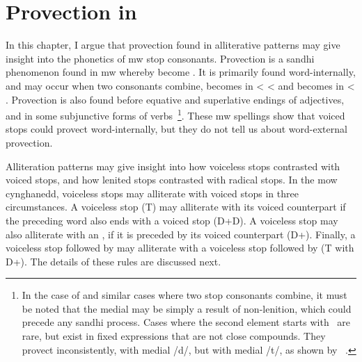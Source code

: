 \chapter{Provection in }
\label{cha:prov-mwbe-y}

In this chapter, I argue that provection found in alliterative patterns may give insight into the phonetics of \gls{mw} stop consonants.
Provection is a sandhi phenomenon found in \gls{mw} whereby  become .  It is primarily found word-internally, and
may occur when two consonants combine, \eg {} becomes 
in   <  <  and  becomes  in  < .
Provection is also found before equative and superlative endings of
adjectives, and in some subjunctive forms of
verbs~\autocite[§~17]{evans_grammar_1964}\footnote{In the case
  of  and similar cases where two stop consonants combine,
  it must be noted that the medial  may be simply a result of
  non-lenition, which could precede any sandhi process. Cases where
  the second element starts with \xD\ are rare, but exist in fixed
  expressions that are not close compounds. They provect
  inconsistently, \eg {} with
  medial /d/, but  with medial /t/, as
  shown by ~\autocite[s.v.\ \emph{rhad}]{bevan_geiriadur_2014}.}.
These \gls{mw} spellings show that voiced stops could provect
word-internally, but they do not tell us about word-external
provection.

Alliteration patterns may give insight into how voiceless stops
contrasted with voiced stops, and how lenited stops contrasted with
radical stops. In the \gls{mow} cynghanedd, voiceless stops may
alliterate with voiced stops in three circumstances. A voiceless stop
(\gls{T}) may alliterate with its voiced counterpart if the
preceding word also ends with a voiced stop (\gls{D}+\gls{D}). A
voiceless stop may also alliterate with an , if it is preceded
by its voiced counterpart (\gls{D}+). Finally, a voiceless stop
followed by  may alliterate with a voiceless stop followed
by  (\gls{T} with \gls{D}+).
The details of these rules are discussed next.


